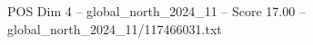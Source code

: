 \begin{textsample}{POS Dim 4 – global\_north\_2024\_11 – Score 17.00 – global\_north\_2024\_11/117466031.txt}
\end{textsample}
